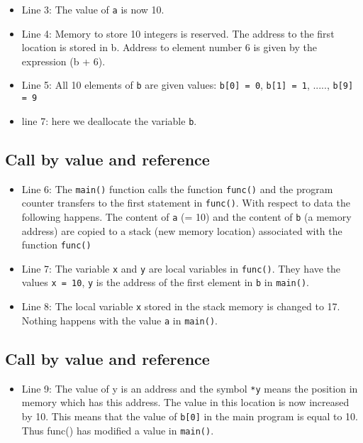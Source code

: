 \documentclass[%
oneside,                 %
final,                   %
10pt]{article}
\begin{document}
{{{{{{{{{{{\begin{itemize}
  \item Line 3: The value of \Verb!a! is now 10.

  \item Line 4: Memory to store 10 integers is reserved. The address to the first location is stored in b. Address to element number 6 is given by the expression (b + 6).

  \item Line 5: All 10 elements of \Verb!b! are given values: \Verb!b[0] = 0!, \Verb!b[1] = 1!, ....., \Verb!b[9] = 9!

  \item line 7: here we deallocate the variable \Verb!b!.
\end{itemize}

\noindent
\subsection{Call by value and reference}

\begin{itemize}
  \item Line 6: The \Verb!main()! function calls the function \Verb!func()! and the program counter transfers to the first statement in \Verb!func()!. With respect to data the following happens. The content of \Verb!a! (= 10) and the content of \Verb!b! (a memory address) are copied to a stack (new memory location) associated with the function \Verb!func()!

  \item Line 7: The variable \Verb!x! and \Verb!y! are local variables in \Verb!func()!. They have the values  \Verb!x = 10!, \Verb!y! is the address of the first element in \Verb!b! in \Verb!main()!.

  \item Line 8: The local variable \Verb!x! stored in the stack memory is changed to 17. Nothing happens with the value \Verb!a! in \Verb!main()!.
\end{itemize}

\noindent
\subsection{Call by value and reference}

\begin{itemize}
  \item Line 9: The value of y is an address and the symbol \Verb!*y! means the position in memory which has this address. The value in this location is now increased by 10. This means that the value of \Verb!b[0]! in the main program is equal to 10. Thus func() has modified a value in \Verb!main()!.


\end{itemize}}}}}}}}}}}}
\end{document}
